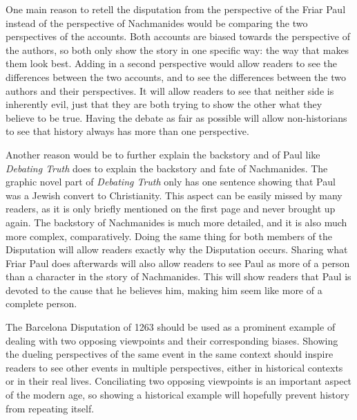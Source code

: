 \documentclass[12pt]{article}
\begin{document}
One main reason to retell the disputation from the perspective of the Friar Paul instead of the perspective of Nachmanides would be comparing the two perspectives of the accounts.
Both accounts are biased towards the perspective of the authors, so both only show the story in one specific way: the way that makes them look best.
Adding in a second perspective would allow readers to see the differences between the two accounts, and to see the differences between the two authors and their perspectives.
It will allow readers to see that neither side is inherently evil, just that they are both trying to show the other what they believe to be true.
Having the debate as fair as possible will allow non-historians to see that history always has more than one perspective.

Another reason would be to further explain the backstory and of Paul like \emph{Debating Truth} does to explain the backstory and fate of Nachmanides.
The graphic novel part of \emph{Debating Truth} only has one sentence showing that Paul was a Jewish convert to Christianity.
This aspect can be easily missed by many readers, as it is only briefly mentioned on the first page and never brought up again.
The backstory of Nachmanides is much more detailed, and it is also much more complex, comparatively.
Doing the same thing for both members of the Disputation will allow readers exactly why the Disputation occurs.
Sharing what Friar Paul does afterwards will also allow readers to see Paul as more of a person than a character in the story of Nachmanides.
This will show readers that Paul is devoted to the cause that he believes him, making him seem like more of a complete person.

The Barcelona Disputation of 1263 should be used as a prominent example of dealing with two opposing viewpoints and their corresponding biases.
Showing the dueling perspectives of the same event in the same context should inspire readers to see other events in multiple perspectives, either in historical contexts or in their real lives.
Conciliating two opposing viewpoints is an important aspect of the modern age, so showing a historical example will hopefully prevent history from repeating itself.
\end{document}
